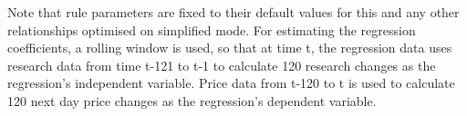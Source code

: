 \documentclass{article}%
\begin{document}
\vspace{1mm}
\justify Note that rule parameters are fixed to their default values for this and any other relationships optimised on simplified mode. For estimating the regression coefficients, a rolling window is used, so that at time t, the regression data uses research data from time t-121 to t-1 to calculate 120 research changes as the regression's independent variable. Price data from t-120 to t is used to calculate 120 next day price changes as the regression's dependent variable. %

\assumptions%
\keyterms%
\furtherlinks%
\appendixinfertrade{

\vspace{1mm}

\regressionanderrorpartone}
\end{document}
